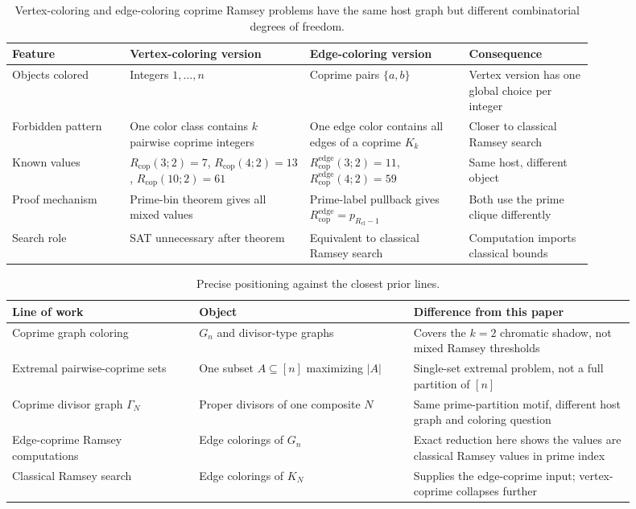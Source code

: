 \documentclass[11pt]{article}
\theoremstyle{plain}
\theoremstyle{definition}
\theoremstyle{remark}
\newcommand{\Rcop}{R_{\mathrm{cop}}}
\newcommand{\Redge}{R_{\mathrm{cop}}^{\mathrm{edge}}}
\newcommand{\Rcl}{R_{\mathrm{cl}}}
\begin{document}
\begin{table}[htbp]
\centering
\caption{Vertex-coloring and edge-coloring coprime Ramsey problems have the
same host graph but different combinatorial degrees of freedom.}
\label{tab:vertex-edge-comparison}
\small
\begin{tabular}{@{}>{\raggedright\arraybackslash}p{0.17\linewidth}>{\raggedright\arraybackslash}p{0.26\linewidth}>{\raggedright\arraybackslash}p{0.23\linewidth}>{\raggedright\arraybackslash}p{0.18\linewidth}@{}}
\toprule
Feature & Vertex-coloring version & Edge-coloring version & Consequence \\
\midrule
Objects colored & Integers $1,\ldots,n$ & Coprime pairs $\{a,b\}$ & Vertex version has one global choice per integer \\
Forbidden pattern & One color class contains $k$ pairwise coprime integers & One edge color contains all edges of a coprime $K_k$ & Closer to classical Ramsey search \\
Known values & $\Rcop(3;2)=7$, $\Rcop(4;2)=13$, $\Rcop(10;2)=61$ & $\Redge(3;2)=11$, $\Redge(4;2)=59$ & Same host, different object \\
Proof mechanism & Prime-bin theorem gives all mixed values & Prime-label pullback gives $\Redge=p_{\Rcl-1}$ & Both use the prime clique differently \\
Search role & SAT unnecessary after theorem & Equivalent to classical Ramsey search & Computation imports classical bounds \\
\bottomrule
\end{tabular}

\end{table}

\begin{table}[htbp]
\centering
\caption{Precise positioning against the closest prior lines.}
\label{tab:prior-positioning}
\small
\begin{tabular}{@{}>{\raggedright\arraybackslash}p{0.27\linewidth}>{\raggedright\arraybackslash}p{0.31\linewidth}>{\raggedright\arraybackslash}p{0.32\linewidth}@{}}
\toprule
Line of work & Object & Difference from this paper \\
\midrule
Coprime graph coloring & $G_n$ and divisor-type graphs & Covers the $k=2$ chromatic shadow, not mixed Ramsey thresholds \\
Extremal pairwise-coprime sets & One subset $A\subseteq[n]$ maximizing $|A|$ & Single-set extremal problem, not a full partition of $[n]$ \\
Coprime divisor graph $\Gamma_N$ & Proper divisors of one composite $N$ & Same prime-partition motif, different host graph and coloring question \\
Edge-coprime Ramsey computations & Edge colorings of $G_n$ & Exact reduction here shows the values are classical Ramsey values in prime index \\
Classical Ramsey search & Edge colorings of $K_N$ & Supplies the edge-coprime input; vertex-coprime collapses further \\
\bottomrule
\end{tabular}

\end{table}
\end{document}
